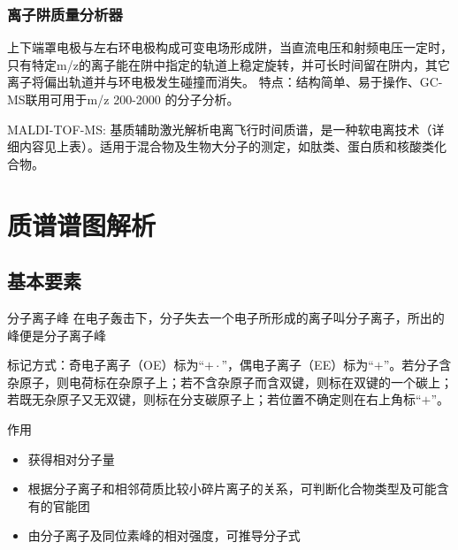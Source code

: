 \subsubsection*{离子阱质量分析器}
上下端罩电极与左右环电极构成可变电场形成阱，当直流电压和射频电压一定时，只有特定m/z的离子能在阱中指定的轨道上稳定旋转，并可长时间留在阱内，其它离子将偏出轨道并与环电极发生碰撞而消失。
特点：结构简单、易于操作、GC-MS联用可用于m/z 200-2000 的分子分析。

\begin{definition*}{MALDI-TOF-MS:}
    基质辅助激光解析电离飞行时间质谱，是一种软电离技术（详细内容见上表）。适用于混合物及生物大分子的测定，如肽类、蛋白质和核酸类化合物。
\end{definition*}

\section{质谱谱图解析}
\subsection{基本要素}
\begin{definition*}{分子离子峰}
    在电子轰击下，分子失去一个电子所形成的离子叫分子离子，所出的峰便是分子离子峰
\end{definition*}
\begin{note}
    标记方式：奇电子离子（OE）标为“$+\cdot$”，偶电子离子（EE）标为“$+$”。若分子含杂原子，则电荷标在杂原子上；若不含杂原子而含双键，则标在双键的一个碳上；若既无杂原子又无双键，则标在分支碳原子上；若位置不确定则在右上角标“$+$”。
\end{note}

作用
\begin{itemize}
    \item 获得相对分子量
    \item 根据分子离子和相邻荷质比较小碎片离子的关系，可判断化合物类型及可能含有的官能团
    \item 由分子离子及同位素峰的相对强度，可推导分子式
\end{itemize}

